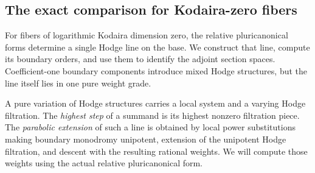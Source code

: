 \subsection{The exact comparison for Kodaira-zero fibers}
\label{rankone:section}

For fibers of logarithmic Kodaira dimension zero, the relative
pluricanonical forms determine a single Hodge line on the base.  We
construct that line, compute its boundary orders, and use them to
identify the adjoint section spaces.  Coefficient-one boundary
components introduce mixed Hodge structures, but the line itself
lies in one pure weight grade.

A pure variation of Hodge structures carries a local system and a
varying Hodge filtration. The \emph{highest step} of a summand is its
highest nonzero filtration piece. The \emph{parabolic extension} of
such a line is obtained by local power substitutions making boundary
monodromy unipotent, extension of the unipotent Hodge filtration, and
descent with the resulting rational weights. We will compute those
weights using the actual relative pluricanonical form.

